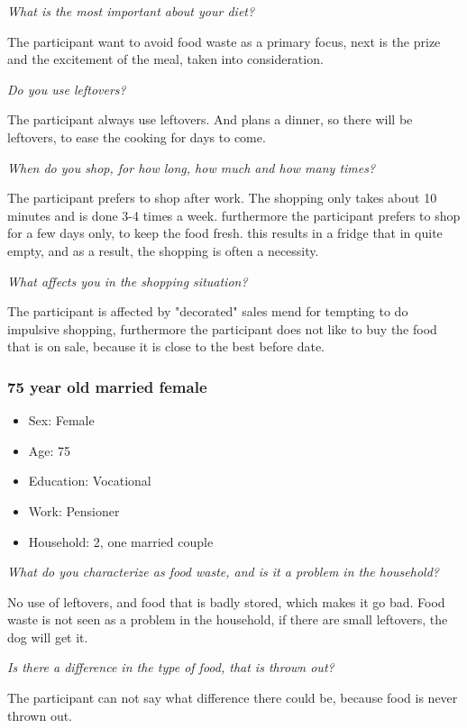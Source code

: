 \emph{What is the most important about your diet?}

The participant want to avoid food waste as a primary focus, next is the prize and the excitement of the meal, taken into consideration.

\emph{Do you use leftovers?}

The participant always use leftovers. And plans a dinner, so there will be leftovers, to ease the cooking for days to come.

\emph{When do you shop, for how long, how much and how many times?}

The participant prefers to shop after work. The shopping only takes about 10 minutes and is done 3-4 times a week. furthermore the participant prefers to shop for a few days only, to keep the food fresh. this results in a fridge that in quite empty, and as a result, the shopping is often a necessity.

\emph{What affects you in the shopping situation?}

The participant is affected by "decorated" sales mend for tempting to do impulsive shopping, furthermore the participant does not like to buy the food that is on sale, because it is close to the best before date.
\subsubsection{75 year old married female}
\begin{itemize}
  \item Sex: Female
  \item Age: 75
  \item Education: Vocational
  \item Work: Pensioner
  \item Household: 2, one married couple
\end{itemize}
\emph{What do you characterize as food waste, and is it a problem in the household?}

No use of leftovers, and food that is badly stored, which makes it go bad. Food waste is not seen as a problem in the household, if there are small leftovers, the dog will get it.

\emph{Is there a difference in the type of food, that is thrown out?}

The participant can not say what difference there could be, because food is never thrown out.


